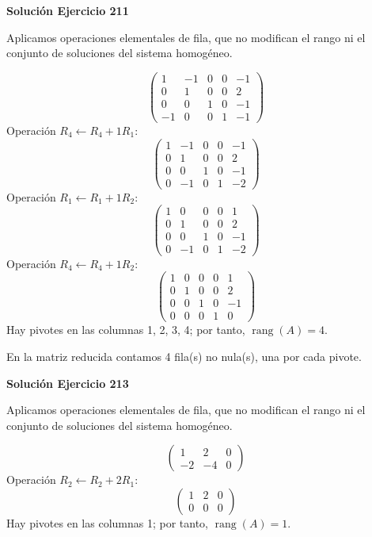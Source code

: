 \documentclass[12pt]{article}
\newcommand{\rang}{\operatorname{rang}}
\begin{document}
\par\bigskip\noindent\textbf{Solución Ejercicio 211}\par\nobreak
Aplicamos operaciones elementales de fila, que no modifican el rango ni el conjunto de soluciones del sistema homogéneo.

\[
\begin{pmatrix}1&-1&0&0&-1\\0&1&0&0&2\\0&0&1&0&-1\\-1&0&0&1&-1\end{pmatrix}
\]
Operación $R_{4}\leftarrow R_{4}+1R_{1}$:
\[
\begin{pmatrix}1&-1&0&0&-1\\0&1&0&0&2\\0&0&1&0&-1\\0&-1&0&1&-2\end{pmatrix}
\]
Operación $R_{1}\leftarrow R_{1}+1R_{2}$:
\[
\begin{pmatrix}1&0&0&0&1\\0&1&0&0&2\\0&0&1&0&-1\\0&-1&0&1&-2\end{pmatrix}
\]
Operación $R_{4}\leftarrow R_{4}+1R_{2}$:
\[
\begin{pmatrix}1&0&0&0&1\\0&1&0&0&2\\0&0&1&0&-1\\0&0&0&1&0\end{pmatrix}
\]
Hay pivotes en las columnas 1, 2, 3, 4; por tanto, $\boxed{\rang(A)=4}$.

En la matriz reducida contamos 4 fila(s) no nula(s), una por cada pivote.


\par\bigskip\noindent\textbf{Solución Ejercicio 213}\par\nobreak
Aplicamos operaciones elementales de fila, que no modifican el rango ni el conjunto de soluciones del sistema homogéneo.

\[
\begin{pmatrix}1&2&0\\-2&-4&0\end{pmatrix}
\]
Operación $R_{2}\leftarrow R_{2}+2R_{1}$:
\[
\begin{pmatrix}1&2&0\\0&0&0\end{pmatrix}
\]
Hay pivotes en las columnas 1; por tanto, $\boxed{\rang(A)=1}$.
\end{document}
